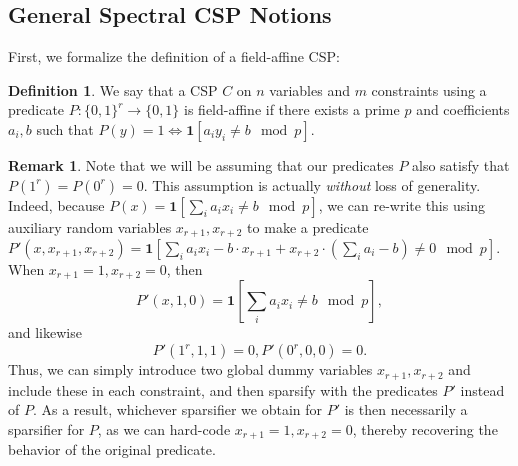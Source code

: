 \documentclass[11pt]{article}
\theoremstyle{definition}
\newtheorem{definition}{Definition}[section]
\newtheorem{remark}[theorem]{Remark}
\newcommand{\zo}{\{0, 1\}}
\begin{document}
\subsection{General Spectral CSP Notions}

First, we formalize the definition of a field-affine CSP:

\begin{definition}\label{def:fieldaffine}
    We say that a CSP $C$ on $n$ variables and $m$ constraints using a predicate $P: \zo^r \rightarrow \zo$ is field-affine if there exists a prime $p$ and coefficients $a_i, b$ such that $P(y) = 1 \iff \mathbf{1}[a_i y_i \neq b \mod p]$.
\end{definition}

\begin{remark}\label{rmk:zeroPredicate}
Note that we will be assuming that our predicates $P$ also satisfy that $P(1^r) = P(0^r) = 0$. This assumption is actually \emph{without} loss of generality. Indeed, because $P(x) = \mathbf{1}[\sum_i a_i x_i \neq b \mod p]$, we can re-write this using auxiliary random variables $x_{r+1}, x_{r+2}$ to make a predicate $P'(x, x_{r+1}, x_{r+2}) = \mathbf{1}[\sum_i a_i x_i - b \cdot x_{r+1} + x_{r+2} \cdot (\sum_i a_i - b) \neq 0 \mod p]$. When $x_{r+1} = 1, x_{r+2} = 0$, then 
\[
P'(x, 1, 0) = \mathbf{1}[\sum_i a_i x_i \neq b \mod p],
\]
and likewise
\[
P'(1^r, 1, 1) = 0, P'(0^r, 0, 0) = 0.
\]
Thus, we can simply introduce two global dummy variables $x_{r+1}, x_{r+2}$ and include these in each constraint, and then sparsify with the predicates $P'$ instead of $P$. As a result, whichever sparsifier we obtain for $P'$ is then necessarily a sparsifier for $P$, as we can hard-code $x_{r+1} = 1, x_{r+2} = 0$, thereby recovering the behavior of the original predicate. 
\end{remark}
\end{document}
